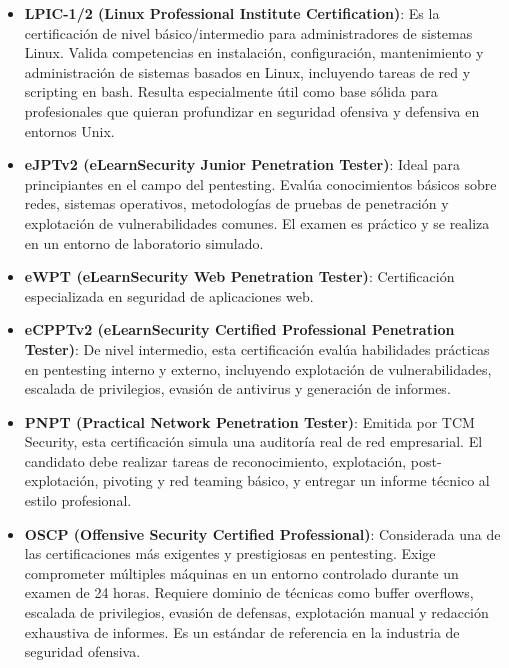 \documentclass[a4paper, 11pt]{article}
\begin{document}
\begin{itemize}
    \item \textbf{LPIC-1/2 (Linux Professional Institute Certification)}: Es la certificación de nivel básico/intermedio para administradores de sistemas Linux. Valida competencias en instalación, configuración, mantenimiento y administración de sistemas basados en Linux, incluyendo tareas de red y scripting en bash. Resulta especialmente útil como base sólida para profesionales que quieran profundizar en seguridad ofensiva y defensiva en entornos Unix.

    \item \textbf{eJPTv2 (eLearnSecurity Junior Penetration Tester)}: Ideal para principiantes en el campo del pentesting. Evalúa conocimientos básicos sobre redes, sistemas operativos, metodologías de pruebas de penetración y explotación de vulnerabilidades comunes. El examen es práctico y se realiza en un entorno de laboratorio simulado.

    \item \textbf{eWPT (eLearnSecurity Web Penetration Tester)}: Certificación especializada en seguridad de aplicaciones web.

    \item \textbf{eCPPTv2 (eLearnSecurity Certified Professional Penetration Tester)}: De nivel intermedio, esta certificación evalúa habilidades prácticas en pentesting interno y externo, incluyendo explotación de vulnerabilidades, escalada de privilegios, evasión de antivirus y generación de informes.

    \item \textbf{PNPT (Practical Network Penetration Tester)}: Emitida por TCM Security, esta certificación simula una auditoría real de red empresarial. El candidato debe realizar tareas de reconocimiento, explotación, post-explotación, pivoting y red teaming básico, y entregar un informe técnico al estilo profesional.

    \item \textbf{OSCP (Offensive Security Certified Professional)}: Considerada una de las certificaciones más exigentes y prestigiosas en pentesting. Exige comprometer múltiples máquinas en un entorno controlado durante un examen de 24 horas. Requiere dominio de técnicas como buffer overflows, escalada de privilegios, evasión de defensas, explotación manual y redacción exhaustiva de informes. Es un estándar de referencia en la industria de seguridad ofensiva.
\end{itemize}
\end{document}
